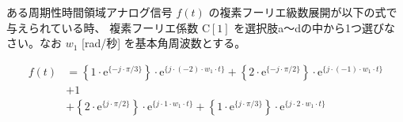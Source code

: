 ある周期性時間領域アナログ信号 $f(t)$ の複素フーリエ級数展開が以下の式で与えられている時、
複素フーリエ係数 $\textrm{C}[1]$ を選択肢a〜dの中から1つ選びなさい。なお $w_1$ [rad/秒] を基本角周波数とする。

\begin{align*}
f(t) 
&= \left \{ 1 \cdot \textrm{e}^{\{-j \cdot \pi/3 \}} \right \} \cdot \textrm{e}^{\{ j \cdot (-2) \cdot w_1 \cdot t \}} 
 + \left \{ 2 \cdot \textrm{e}^{\{-j \cdot \pi/2 \}} \right \} \cdot \textrm{e}^{\{ j \cdot (-1) \cdot w_1 \cdot t \}} \\
&+ 1 \\
&+ \left \{ 2 \cdot \textrm{e}^{\{ j \cdot \pi/2 \}} \right \} \cdot \textrm{e}^{\{ j \cdot    1 \cdot w_1 \cdot t \}} 
 + \left \{ 1 \cdot \textrm{e}^{\{ j \cdot \pi/3 \}} \right \} \cdot \textrm{e}^{\{ j \cdot    2 \cdot w_1 \cdot t \}} 
\end{align*}
